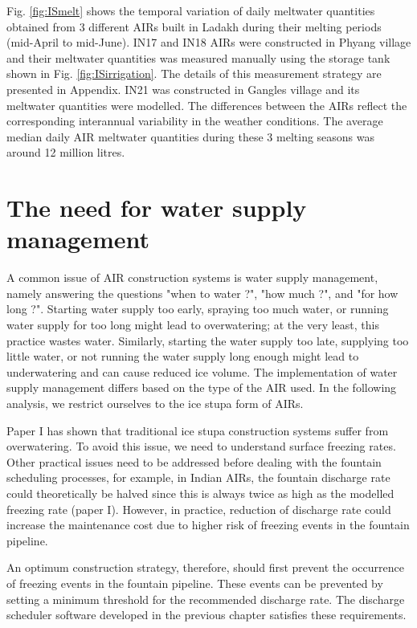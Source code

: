 Fig. \ref{fig:ISmelt} shows the temporal variation of daily meltwater quantities obtained from 3 different AIRs
built in Ladakh during their melting periods (mid-April to mid-June). IN17 and IN18 AIRs were constructed in
Phyang village and their meltwater quantities was measured manually using the storage tank shown in Fig.
\ref{fig:ISirrigation}. The details of this measurement strategy are presented in Appendix. IN21 was constructed
in Gangles village and its meltwater quantities were modelled. The differences between the AIRs reflect the
corresponding interannual variability in the weather conditions. The average median daily AIR meltwater
quantities during these 3 melting seasons was around 12 million litres.   

\section{The need for water supply management}

A common issue of AIR construction systems is water supply management, namely answering the questions "when to
water ?", "how much ?", and "for how long ?". Starting water supply too early, spraying too much water, or
running water supply for too long might lead to overwatering; at the very least, this practice wastes water.
Similarly, starting the water supply too late, supplying too little water, or not running the water supply long
enough might lead to underwatering and can cause reduced ice volume. The implementation of water supply management
differs based on the type of the AIR used. In the following analysis, we restrict ourselves to the ice stupa
form of AIRs.

Paper I has shown that traditional ice stupa construction systems suffer from overwatering. To avoid
this issue, we need to understand surface freezing rates. Other practical issues need to be addressed before
dealing with the fountain scheduling processes, for example, in Indian AIRs, the fountain discharge rate could
theoretically be halved since this is always twice as high as the modelled freezing rate (paper I). However, in
practice, reduction of discharge rate could increase the maintenance cost due to higher risk of freezing events
in the fountain pipeline.

An optimum construction strategy, therefore, should first prevent the occurrence of freezing events in the
fountain pipeline. These events can be prevented by setting a minimum threshold for the recommended discharge
rate. The discharge scheduler software developed in the previous chapter satisfies these requirements.

